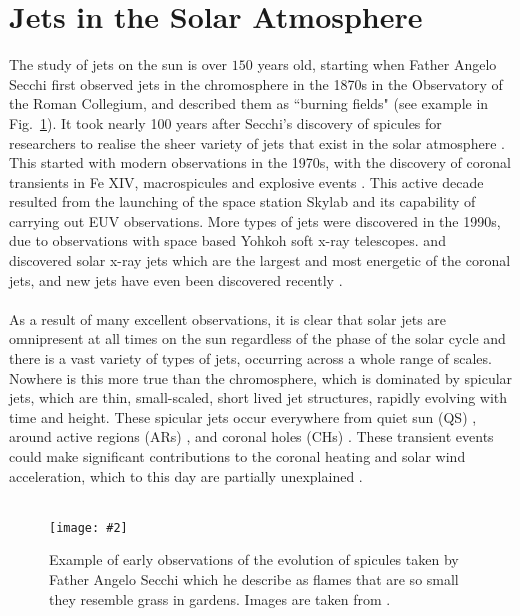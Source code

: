 \documentclass[12pt]{ociamthesis}
\newcommand{\mfig}[4]{
  \begin{figure}
  \begin{center}
  \texttt{[image: \#2]}
  \caption{#3}
  \label{#4}
  \end{center}
  \end{figure}}
\newcommand{\np}{\\ \\}
\begin{document}
\section{Jets in the Solar Atmosphere}
\label{sec:spicule-jets}
The study of jets on the sun is over $150$ years old, starting when Father Angelo Secchi first observed jets in the chromosphere in the 1870s in the Observatory of the Roman Collegium, and described them as ``burning fields" (see example in Fig.~\ref{de_flammes}). It took nearly 100 years after Secchi's discovery of spicules for researchers to realise the sheer variety of jets that exist in the solar atmosphere \citep{Raouafi2016}. This started with modern observations in the 1970s, with the discovery of coronal transients in Fe XIV, macrospicules and explosive events \citep{Demastus1973, Bohlin1975ApJ197L133B, Withbroe1976ApJ, Brueckner1980HiA}. This active decade resulted from the launching of the space station Skylab and its capability of carrying out EUV observations. More types of jets were discovered in the 1990s, due to observations with space based Yohkoh soft x-ray telescopes. \cite{Shibata1992PASJ} and \cite{Strong1992PASJ} discovered solar x-ray jets which are the largest and most energetic of the coronal jets, and new jets have even been discovered recently \citep{Cho2019ApJ884L38C}. \np
%
As a result of many excellent observations, it is clear that solar jets are omnipresent at all times on the sun regardless of the phase of the solar cycle and there is a vast variety of types of jets, occurring across a whole range of scales. Nowhere is this more true than the chromosphere, which is dominated by spicular jets, which are thin, small-scaled, short lived jet structures, rapidly evolving with time and height. These spicular jets occur everywhere from quiet sun (QS) \citep{Pontieu2007astroph2081D,Rouppe2007ApJ660L169R,Pereira2012,Pereira2014ApJ}, around active regions (ARs) \citep{Pontieu2007astroph2081D,Pereira2012,Rouppe2013ApJ77656R,Gafeira2017ApJS2296G}, and coronal holes (CHs) \citep{Yamauchi2005ApJ629572Y,Moreno2008ApJ673L211M,Pereira2012,Young2015ApJ801124Y}. These transient events could make significant contributions to the coronal heating and solar wind acceleration, which to this day are partially unexplained \citep{Martinez-Sykora2017, Pontieu2017ApJ, Samanta2019Sci, Zuo2019AcASn, Bale2019Natur}. \np
%
\mfig{0.75}{figures/flammes_alt.png}{Example of early observations of the evolution of spicules taken by Father Angelo Secchi which he describe as flames that are so small they resemble grass in gardens. Images are taken from \cite{Secchi1877}.}{de_flammes}
\end{document}
